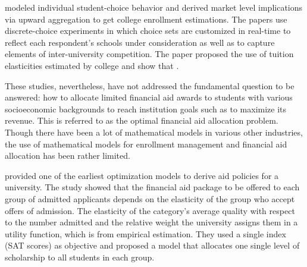 \documentclass[12pt,english]{report}
\begin{document}
%


\citet{Carter2011} modeled individual student-choice behavior and derived
market level implications via upward aggregation to get college enrollment
estimations. The papers use discrete-choice experiments in which choice sets
are customized in real-time to reflect each respondent's  schools under
consideration as well as to capture elements of inter-university competition. 
The paper proposed the use of tuition elasticities estimated by college and
show that .

\vspace{0.25in}
These studies, nevertheless, have not addressed the fundamental question to 
be answered: how to allocate limited financial aid awards to students with 
various socioeconomic backgrounds to reach institution goals such as to
maximize its revenue. This is referred to as the optimal financial aid
allocation problem. Though there have been a lot of mathematical models in
various other industries, the use of mathematical models for enrollment
management and financial aid allocation has been rather limited.

\citet{Ehrenberg1984} provided one of the earliest optimization models to
derive aid policies for a university. The study showed that the financial aid
package to be offered to each group of admitted applicants depends on the
elasticity of the group who accept offers of admission.  The elasticity of 
the category's average quality with respect to the number admitted and the
relative weight the university assigns them in a utility function, which is
from empirical estimation. They used a single index (SAT scores) as 
objective and proposed a model that allocates one single level of scholarship
to all students in each group.
\end{document}
